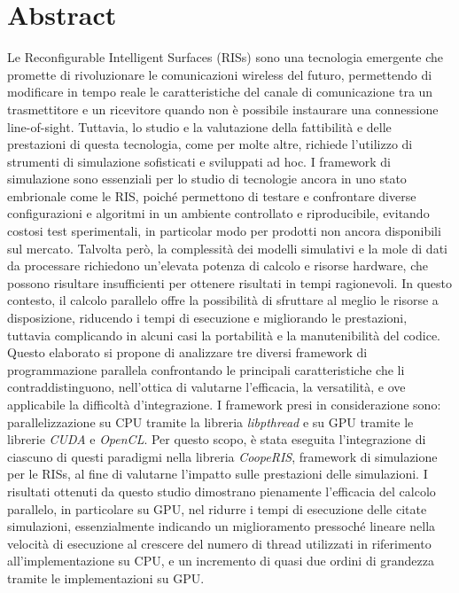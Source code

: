 \chapter*{Abstract}
\label{cha:abtract}

Le Reconfigurable Intelligent Surfaces (RISs) sono una tecnologia emergente che
promette di rivoluzionare le comunicazioni wireless del futuro, permettendo di modificare
in tempo reale le caratteristiche del canale di comunicazione tra un trasmettitore
e un ricevitore quando non è possibile instaurare una connessione line-of-sight.
Tuttavia, lo studio e la valutazione della fattibilità e delle prestazioni di questa
tecnologia, come per molte altre, richiede l'utilizzo di strumenti di simulazione
sofisticati e sviluppati ad hoc. I framework di simulazione sono essenziali per
lo studio di tecnologie ancora in uno stato embrionale come le RIS, poiché permettono
di testare e confrontare diverse configurazioni e algoritmi in un ambiente controllato
e riproducibile, evitando costosi test sperimentali, in particolar modo per prodotti
non ancora disponibili sul mercato. Talvolta però, la complessità dei modelli simulativi
e la mole di dati da processare richiedono un'elevata potenza di calcolo e risorse
hardware, che possono risultare insufficienti per ottenere risultati in tempi
ragionevoli. In questo contesto, il calcolo parallelo offre la possibilità di
sfruttare al meglio le risorse a disposizione, riducendo i tempi di esecuzione e
migliorando le prestazioni, tuttavia complicando in alcuni casi la portabilità e
la manutenibilità del codice. Questo elaborato si propone di analizzare tre diversi
framework di programmazione parallela confrontando le principali caratteristiche
che li contraddistinguono, nell'ottica di valutarne l'efficacia, la versatilità,
e ove applicabile la difficoltà d'integrazione. I framework presi in considerazione
sono: parallelizzazione su CPU tramite la libreria \textit{libpthread} e su GPU tramite
le librerie \textit{CUDA} e \textit{OpenCL}. Per questo scopo, è stata eseguita l'integrazione
di ciascuno di questi paradigmi nella libreria \textit{CoopeRIS}, framework di simulazione
per le RISs, al fine di valutarne l'impatto sulle prestazioni delle simulazioni.
I risultati ottenuti da questo studio dimostrano pienamente l'efficacia del calcolo
parallelo, in particolare su GPU, nel ridurre i tempi di esecuzione delle citate
simulazioni, essenzialmente indicando un miglioramento pressoché lineare nella
velocità di esecuzione al crescere del numero di thread utilizzati in
riferimento all'implementazione su CPU, e un incremento di quasi due ordini di grandezza
tramite le implementazioni su GPU.
